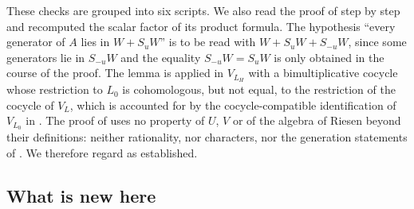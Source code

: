 \documentclass[leqno]{article}
\numberwithin{equation}{section}
\begin{document}
These checks are grouped into six scripts. We also read the proof of \cite[Lemma 7.1]{DJX26} step by step and recomputed the scalar factor of its product formula. The hypothesis ``every generator of $A$ lies in $W+S_uW$'' is to be read with $W+S_uW+S_{-u}W$, since some generators lie in $S_{-u}W$ and the equality $S_{-u}W = S_uW$ is only obtained in the course of the proof. The lemma is applied in $V_{L_H}$ with a bimultiplicative cocycle whose restriction to $L_0$ is cohomologous, but not equal, to the restriction of the cocycle of $V_L$, which is accounted for by the cocycle-compatible identification of $V_{L_0}$ in \cite[(5.7)]{DJX26}. The proof of \cite[Theorem 7.3]{DJX26} uses no property of $U$, $V$ or of the algebra of Riesen beyond their definitions: neither rationality, nor characters, nor the generation statements of \cite{Hua26,Jia26,Rie26}. We therefore regard \cite[Proposition 4.1, Theorem 7.3 and Proposition 8.1]{DJX26} as established.


\subsection{What is new here}
\end{document}
